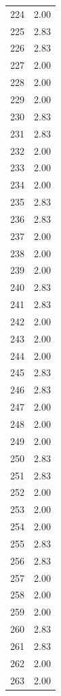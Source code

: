 \documentclass[a4paper,11pt]{article}
\begin{document}
\begin{center}
\begin{longtable}{|R{1.5cm}|R{2.5cm}|}
  224  &         2.00 \\ 
  225  &         2.83 \\ 
  226  &         2.83 \\ 
  227  &         2.00 \\ 
  228  &         2.00 \\ 
  229  &         2.00 \\ 
  230  &         2.83 \\ 
  231  &         2.83 \\ 
  232  &         2.00 \\ 
  233  &         2.00 \\ 
  234  &         2.00 \\ 
  235  &         2.83 \\ 
  236  &         2.83 \\ 
  237  &         2.00 \\ 
  238  &         2.00 \\ 
  239  &         2.00 \\ 
  240  &         2.83 \\ 
  241  &         2.83 \\ 
  242  &         2.00 \\ 
  243  &         2.00 \\ 
  244  &         2.00 \\ 
  245  &         2.83 \\ 
  246  &         2.83 \\ 
  247  &         2.00 \\ 
  248  &         2.00 \\ 
  249  &         2.00 \\ 
  250  &         2.83 \\ 
  251  &         2.83 \\ 
  252  &         2.00 \\ 
  253  &         2.00 \\ 
  254  &         2.00 \\ 
  255  &         2.83 \\ 
  256  &         2.83 \\ 
  257  &         2.00 \\ 
  258  &         2.00 \\ 
  259  &         2.00 \\ 
  260  &         2.83 \\ 
  261  &         2.83 \\ 
  262  &         2.00 \\ 
  263  &         2.00 \\ 

\end{longtable}
\end{center}
\end{document}
